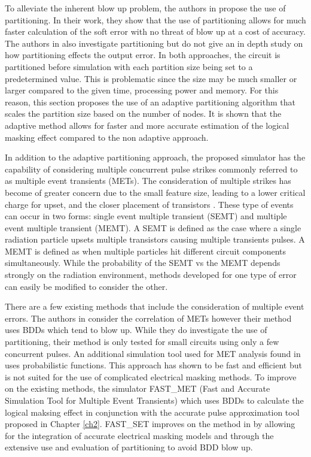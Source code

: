 To alleviate the inherent blow up problem, the authors in \cite{FASER} propose the use of partitioning. In their work, they show that the use of partitioning allows for much faster calculation of the soft error with no threat of blow up at a cost of accuracy. The authors in \cite{METSys} also investigate partitioning but do not give an in depth study on how partitioning effects the output error. In both approaches, the circuit is partitioned before simulation with each partition size being set to a predetermined value. This is problematic since the size may be much smaller or larger compared to the given time, processing power and memory. For this reason, this section proposes the use of an adaptive partitioning algorithm that scales the partition size based on the number of nodes. It is shown that the adaptive method allows for faster and more accurate estimation of the logical masking effect compared to the non adaptive approach.

In addition to the adaptive partitioning approach, the proposed simulator has the capability of considering multiple concurrent pulse strikes commonly referred to as multiple event transients (METs). The consideration of multiple strikes has become of greater concern due to the small feature size, leading to a lower critical charge for upset, and the closer placement of transistors \cite{Rossi2005}. These type of events can occur in two forms: single event multiple transient (SEMT) and multiple event multiple transient (MEMT). A SEMT is defined as the case where a single radiation particle upsets multiple transistors causing multiple transients pulses. A MEMT is defined as when multiple particles hit different circuit components simultaneously. While the probability of the SEMT vs the MEMT depends strongly on the radiation environment, methods developed for one type of error can easily be modified to consider the other. 

There are a few existing methods that include the consideration of multiple event errors. The authors in \cite{METSys} consider the correlation of METs however their method uses BDDs which tend to blow up. While they do investigate the use of partitioning, their method is only tested for small circuits using only a few concurrent pulses. An additional simulation tool used for MET analysis found in \cite{Fazeli2011} uses probabilistic functions. This approach has shown to be fast and efficient but is not suited for the use of complicated electrical masking methods. To improve on the existing methods, the simulator FAST\_MET (Fast and Accurate Simulation Tool for Multiple Event Transients) which uses BDDs to calculate the logical maksing effect in conjunction with the accurate pulse approximation tool proposed in Chapter \ref{ch2}. FAST\_SET improves on the method in \cite{METSys} by allowing for the integration of accurate electrical masking models and through the extensive use and evaluation of partitioning to avoid BDD blow up.    

